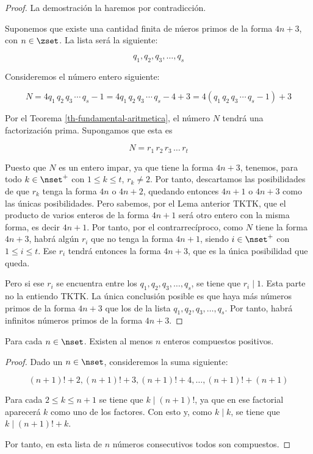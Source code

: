 \begin{proof}
  La demostración la haremos por contradicción.

  Suponemos que existe una cantidad finita de núeros primos de la forma $4n
  + 3$, con $n \in \zset$. La lista será la siguiente:

  $$ q_1, q_2, q_3, \ldots, q_s $$

  \noindent Consideremos el número entero siguiente:

  $$ N = 4 q_1 \, q_2 \, q_3 \, \cdots \, q_s - 1 = 4 q_1 \, q_2 \, q_3 \,
  \cdots \, q_s - 4 + 3 = 4(q_1 \, q_2 \, q_3 \, \cdots \, q_s - 1) + 3 $$

  Por el Teorema \ref{th-fundamental-aritmetica}, el número $N$ tendrá una
  factorización prima. Supongamos que esta es

  $$ N = r_1 \, r_2 \, r_3 \, \ldots \, r_t $$

  Puesto que $N$ es un entero impar, ya que tiene la forma $4n + 3$,
  tenemos, para todo $k \in \nset^{+}$ con $1 \leq k \leq t$, $r_k \neq 2$.
  Por tanto, descartamos las posibilidades de que $r_k$ tenga la forma $4n$
  o $4n + 2$, quedando entonces $4n + 1$ o $4n + 3$ como las únicas
  posibilidades. Pero sabemos, por el Lema anterior TKTK, que el producto de
  varios enteros de la forma $4n + 1$ será otro entero con la misma forma,
  es decir $4n + 1$. Por tanto, por el contrarrecíproco, como $N$ tiene la
  forma $4n + 3$, habrá algún $r_i$ que no tenga la forma $4n + 1$, siendo
  $i \in \nset^{+}$ con $1 \leq i \leq t$. Ese $r_i$ tendrá entonces la
  forma $4n + 3$, que es la única posibilidad que queda.

  Pero si ese $r_i$ se encuentra entre los $q_1, q_2, q_3, \ldots, q_s$, se
  tiene que $r_i \mid 1$. Esta parte no la entiendo TKTK. La única
  conclusión posible es que haya más números primos de la forma $4n + 3$ que
  los de la lista $q_1, q_2, q_3, \ldots, q_s$. Por tanto, habrá infinitos
  números primos de la forma $4n + 3$.
\end{proof}

\begin{proposition}
  Para cada $n \in \nset$. Existen al menos $n$ enteros compuestos
  positivos.
\end{proposition}

\begin{proof}
  Dado un $n \in \nset$, consideremos la suma siguiente:

  $$ (n+1)! + 2, (n+1)! + 3, (n+1)! + 4, \ldots, (n+1)! + (n+1) $$

  Para cada $2 \leq k \leq n+1$ se tiene que $k \mid (n+1)!$, ya que en ese
  factorial aparecerá $k$ como uno de los factores. Con esto y, como $k \mid
  k$, se tiene que $k \mid (n+1)! + k$.

  Por tanto, en esta lista de $n$ números consecutivos todos son compuestos.
\end{proof}

